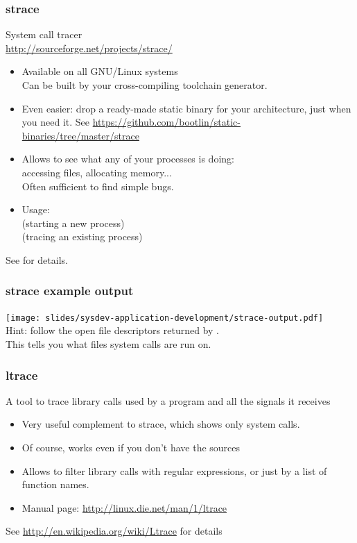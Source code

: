 \begin{frame}
  \frametitle{strace}
  System call tracer\\
  \url{http://sourceforge.net/projects/strace/}
  \begin{itemize}
  \item Available on all GNU/Linux systems\\
    Can be built by your cross-compiling toolchain generator.
  \item Even easier: drop a ready-made static binary for your
        architecture, just when you need it. See
        \url{https://github.com/bootlin/static-binaries/tree/master/strace}
  \item Allows to see what any of your processes is doing:\\
    accessing files, allocating memory...\\
    Often sufficient to find simple bugs.
  \item Usage:\\
     (starting a new process)\\
     (tracing an existing process)
  \end{itemize}
  See  for details.
\end{frame}

\begin{frame}[fragile]
  \frametitle{strace example output}
  \texttt{[image: slides/sysdev-application-development/strace-output.pdf]}\\
  Hint: follow the open file descriptors returned by . \\
  This tells you what files system calls are run on.
\end{frame}

\begin{frame}
  \frametitle{ltrace}
  A tool to trace library calls used by a program and all the signals
  it receives
  \begin{itemize}
  \item Very useful complement to strace, which shows only system
    calls.
  \item Of course, works even if you don't have the sources
  \item Allows to filter library calls with regular expressions, or
    just by a list of function names.
  \item Manual page: \url{http://linux.die.net/man/1/ltrace}
  \end{itemize}
  See \url{http://en.wikipedia.org/wiki/Ltrace} for details
\end{frame}

